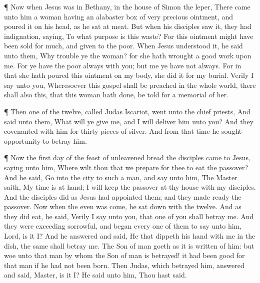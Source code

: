  ¶ Now when Jesus was in Bethany, in the house of Simon the
leper,  There came unto him a woman having an alabaster box
of very precious ointment, and poured it on his head, as he sat at meat.
 But when his disciples saw it, they had indignation,
saying, To what purpose is this waste?  For this ointment
might have been sold for much, and given to the poor.  When
Jesus understood it, he said unto them, Why trouble ye the woman? for
she hath wrought a good work upon me.  For ye have the poor
always with you; but me ye have not always.  For in that
she hath poured this ointment on my body, she did it for my burial.
 Verily I say unto you, Wheresoever this gospel shall be
preached in the whole world, there shall also this, that this woman hath
done, be told for a memorial of her.

 ¶ Then one of the twelve, called Judas Iscariot, went unto
the chief priests,  And said unto them, What will ye give
me, and I will deliver him unto you? And they covenanted with him for
thirty pieces of silver.  And from that time he sought
opportunity to betray him.

 ¶ Now the first day of the feast of unleavened bread the
disciples came to Jesus, saying unto him, Where wilt thou that we
prepare for thee to eat the passover?  And he said, Go into
the city to such a man, and say unto him, The Master saith, My time is
at hand; I will keep the passover at thy house with my disciples.
 And the disciples did as Jesus had appointed them; and
they made ready the passover.  Now when the even was come,
he sat down with the twelve.  And as they did eat, he said,
Verily I say unto you, that one of you shall betray me. 
And they were exceeding sorrowful, and began every one of them to say
unto him, Lord, is it I?  And he answered and said, He that
dippeth his hand with me in the dish, the same shall betray me.
 The Son of man goeth as it is written of him: but woe unto
that man by whom the Son of man is betrayed! it had been good for that
man if he had not been born.  Then Judas, which betrayed
him, answered and said, Master, is it I? He said unto him, Thou hast
said.

